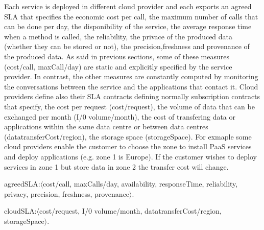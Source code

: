 Each service is deployed in different cloud provider and each exports an agreed SLA that specifies the economic cost per call, the maximum number of calls that can be done per day, the disponibility of the service, the average response time when a method is called, the reliability, the privace of the produced data (whether they can be stored or not), the precision,freshness and provenance of the produced data. As said in previous sections, some of these measures ({\sf cost/call, maxCall/day}) are static and explicitly specified by the service provider. In contrast, the other measures are constantly computed by monitoring the conversations between the service and the applications that contact it.  Cloud providers define also their SLA contracts defining normally subscription contracts that specify, the cost per request ({\sf cost/request}), the volume of data that can be exchanged per month ({\sf I/0 volume/month}), the cost of transfering data or applications within the same data centre or between data centres ({\sf datatransferCost/region}), the storage space ({\sf storageSpace}). For exmaple some cloud providers enable the customer to choose the zone to install PaaS services and deploy applications (e.g. zone 1 is Europe). If the customer wishes to deploy services in zone 1 but store data in zone 2 the transfer cost will change.

\begin{description}
\sf\footnotesize
 \item {\sf agreedSLA:$\langle$cost/call, maxCalls/day, availability, responseTime, reliability, privacy, precision, freshness, provenance$\rangle$}. 
 
 \item  {\sf cloudSLA:$\langle$cost/request, I/0 volume/month, datatransferCost/region, storageSpace$\rangle$}. 
 \end{description}
 

